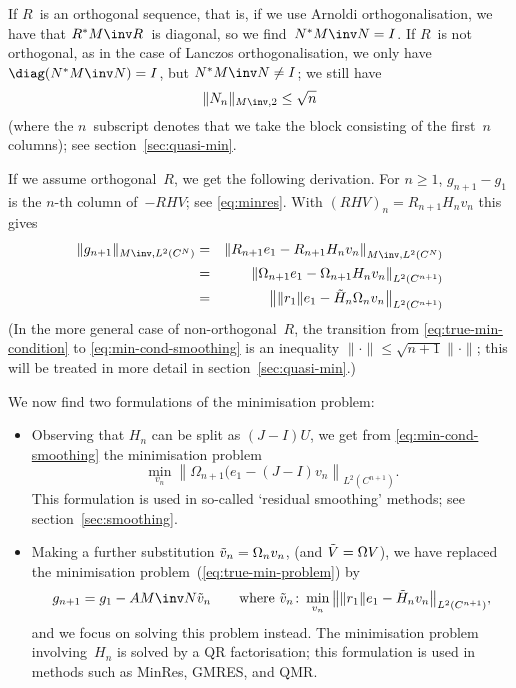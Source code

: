 \documentclass[11pt]{artikel3}
\begin{document}
\begin{Outline}
If $R$~is an orthogonal sequence, that is, if we use Arnoldi orthogonalisation,
we have that $R^*M\inv R$~is diagonal, so we find~$N^*M\inv N=I$.
If $R$~is not orthogonal, as in the case of Lanczos orthogonalisation,
we only have $\diag(N^*M\inv N)=I$, but $N^*M\inv N\not=I$; we still have 
 \begin{equation} \|N_n\|_{M\inv,2}\leq\nobreak\sqrt{n}
 \label{eq:omega-norm}\end{equation}
(where the
$n$~subscript denotes that we take the block consisting of the
first~$n$ columns); see section~\ref{sec:quasi-min}.

If we assume orthogonal~$R$, we get the following derivation.
For $n\geq1$, $g_{n+1}-g_1$ is the $n$-th column of~$-RHV$;
see \eqref{eq:minres}. With $(RHV)_n=R_{n+1}H_nv_n$ this gives
\begin{eqnarray} \|g_{n+1}\|_{M\inv,L^2(C^N)}
&=& \left\| R_{n+1}e_1-R_{n+1}H_nv_n \right\|_{M\inv, L^2(C^N)} 
                                \label{eq:true-min-condition} \\
&=& \left\| \Omega_{n+1}e_1 - \Omega_{n+1}H_nv_n \right\|_{L^2(C^{n+1})} 
                                \label{eq:min-cond-smoothing} \\
&=& \left\| \|r_1\|e_1 - \tilde H_n\Omega_nv_n \right\|_{L^2(C^{n+1})}
                                          \label{eq:min-calculation}
\end{eqnarray}
(In the more general case of non-orthogonal~$R$, the transition from
\eqref{eq:true-min-condition} to \eqref{eq:min-cond-smoothing} is an
inequality $\|\cdot\|\leq\sqrt{n+1}\|\cdot\|$; this will be treated in
more detail in section~\ref{sec:quasi-min}.)

We now find two formulations of the minimisation problem:
\begin{itemize}
\item Observing that $H_n$ can be split as $(J-I)U$, we get from
\eqref{eq:min-cond-smoothing} the minimisation problem
\[ \min_{v_n}\left\| \Omega_{n+1}(e_1 - (J-I)v_n
\right\|_{L^2(C^{n+1})}. \]
This formulation is used in so-called `residual smoothing' methods;
see section~\ref{sec:smoothing}.
\item Making a further substitution $\tilde v_n=\nobreak \Omega_nv_n$,
(and $\tilde V=\nobreak \Omega V$),
we have replaced the minimisation problem~(\ref{eq:true-min-problem}) by
\begin{equation}
    g_{n+1}=g_1-AM\inv N\tilde v_n\qquad\hbox{where
    $\displaystyle \tilde v_n\colon\min_{v_n}\left\| \|r_1\|e_1 
    - \tilde H_n v_n \right\|_{L^2(C^{n+1})}$},
    \label{eq:quasi-min-problem}\end{equation}
and we focus on solving this problem instead.
The minimisation problem involving~$H_n$ is solved by a QR
factorisation; this formulation is used in methods such as MinRes,
GMRES, and QMR.
\end{itemize}


\end{Outline}
\end{document}
